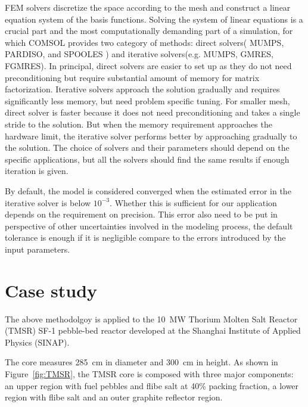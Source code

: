 \documentclass{elsarticle}
\begin{document}
FEM solvers discretize the space according to the mesh and construct a linear equation system of the basis functions. 
Solving the system of linear equations is a crucial part and the most computationally demanding part of a simulation, for which COMSOL provides two category of methods: direct solvers( MUMPS, PARDISO, and SPOOLES ) and iterative solvers(e.g.  MUMPS, GMRES, FGMRES).
In principal, direct solvers are easier to set up as they do not need preconditioning but require substantial amount of memory for matrix factorization. Iterative solvers approach the solution gradually and requires significantly less memory, but need problem specific tuning.
For smaller mesh, direct solver is faster because it does not need preconditioning and takes a single stride to the solution. But when the memory requirement approaches the hardware limit, the iterative solver performs better by approaching gradually to the solution.
The choice of solvers and their parameters should depend on the specific applications, but all the solvers should find the same results if enough iteration is given. 

By default, the model is considered converged when the estimated error in the iterative solver is below $10^{-3}$. Whether this is sufficient for our application depends on the requirement on precision. This error also need to be put in perspective of other uncertainties involved in the modeling process, the default tolerance is enough if it is negligible compare to the errors introduced by the input parameters.







\section{Case study}
\label{sec:res}
The above methodolgoy is applied to the 10~MW Thorium Molten Salt Reactor (TMSR) SF-1 pebble-bed reactor\cite{wang2014a} developed at the Shanghai Institute of Applied Physics (SINAP). 

The core measures 285~cm in diameter and 300~cm in height. As shown in Figure~\ref{fig:TMSR}, the TMSR core is composed with three major components: an upper region with fuel pebbles and flibe salt at 40\% packing fraction, a lower region with flibe salt and an outer graphite reflector region. 
\end{document}
